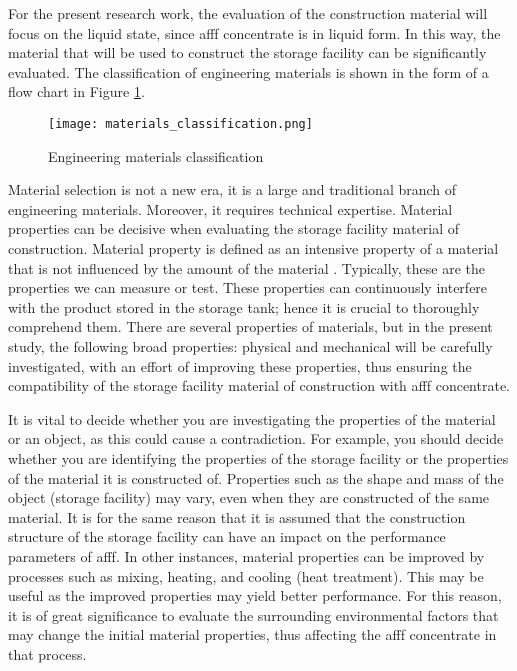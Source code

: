 For the present research work, the evaluation of the construction material will focus on the liquid state, since \acrshort{afff} concentrate is in liquid form. In this way, the material that will be used to construct the storage facility can be significantly evaluated. The classification of engineering materials is shown in the form of a flow chart in Figure \ref{ch3:figure:materials}.

\begin{figure}[H]
    \centering
    \texttt{[image: materials\_classification.png]}
    \caption{Engineering materials classification \cite{timings2008fabrication}}
    \label{ch3:figure:materials}
\end{figure}

Material selection is not a new era, it is a large and traditional branch of engineering materials. Moreover, it requires technical expertise. Material properties can be decisive when evaluating the storage facility material of construction. Material property is defined as an intensive property of a material that is not influenced by the amount of the material \cite{mcarthur2004engineering}. Typically, these are the properties we can measure or test. These properties can continuously interfere with the product stored in the storage tank; hence it is crucial to thoroughly comprehend them. There are several properties of materials, but in the present study, the following broad properties: physical and mechanical will be carefully investigated, with an effort of improving these properties, thus ensuring the compatibility of the storage facility material of construction with \acrshort{afff} concentrate.

It is vital to decide whether you are investigating the properties of the material or an object, as this could cause a contradiction. For example, you should decide whether you are identifying the properties of the storage facility or the properties of the material it is constructed of. Properties such as the shape and mass of the object (storage facility) may vary, even when they are constructed of the same material. It is for the same reason that it is assumed that the construction structure of the storage facility can have an impact on the performance parameters of \acrshort{afff}.  In other instances, material properties can be improved by processes such as mixing, heating, and cooling (heat treatment). This may be useful as the improved properties may yield better performance. For this reason, it is of great significance to evaluate the surrounding environmental factors that may change the initial material properties, thus affecting the \acrshort{afff} concentrate in that process.

